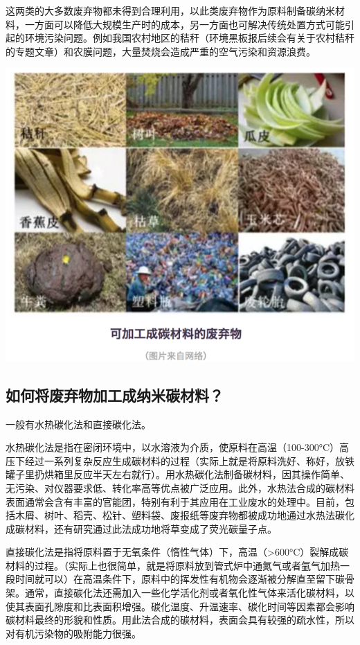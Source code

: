 \documentclass[]{book}
\begin{document}
这两类的大多数废弃物都未得到合理利用，以此类废弃物作为原料制备碳纳米材料，一方面可以降低大规模生产时的成本，另一方面也可解决传统处置方式可能引起的环境污染问题。例如我国农村地区的秸秆（环境黑板报后续会有关于农村秸秆的专题文章）和农膜问题，大量焚烧会造成严重的空气污染和资源浪费。

\includegraphics[width=8.33in]{images/nano2}

\subsection{如何将废弃物加工成纳米碳材料？}

一般有水热碳化法和直接碳化法。

水热碳化法是指在密闭环境中，以水溶液为介质，使原料在高温（100-300°C）高压下经过一系列复杂反应生成碳材料的过程（实际上就是将原料洗好、称好，放铁罐子里扔烘箱里反应半天左右就行）。用水热碳化法制备碳材料，因其操作简单、无污染、对仪器要求低、转化率高等优点被广泛应用。此外，水热法合成的碳材料表面通常会含有丰富的官能团，特别有利于其应用在工业废水的处理中。目前，包括木屑、树叶、稻壳、松针、塑料袋、废报纸等废弃物都被成功地通过水热法碳化成碳材料，还有研究通过此法成功地将草变成了荧光碳量子点。

直接碳化法是指将原料置于无氧条件（惰性气体）下，高温（\textgreater{}600°C）裂解成碳材料的过程。（实际上也很简单，就是将原料放到管式炉中通氮气或者氩气加热一段时间就可以）在高温条件下，原料中的挥发性有机物会逐渐被分解直至留下碳骨架。通常，直接碳化法还需加入一些化学活化剂或者氧化性气体来活化碳材料，以使其表面孔隙度和比表面积增强。碳化温度、升温速率、碳化时间等因素都会影响碳材料最终的形貌和性质。用此法合成的碳材料，表面会具有较强的疏水性，所以对有机污染物的吸附能力很强。
\end{document}
